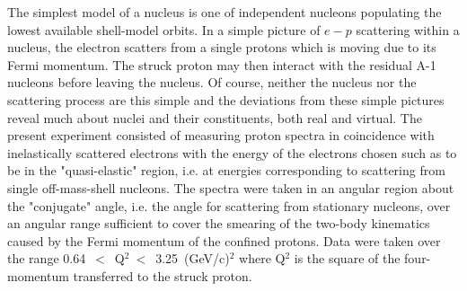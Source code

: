 \documentclass[aps,prl,twocolumn,showpacs,amsmath,amssymb,floats]{revtex4}
\begin{document}
The  simplest  model of  a  nucleus  is  one of  independent  nucleons
populating  the  lowest available  shell-model  orbits.  In a simple
picture of $e-p$ scattering within a  nucleus, the electron scatters from a
single protons which is moving due to its Fermi momentum. The struck proton 
may then interact with the residual A-1 nucleons before leaving the nucleus.  
Of course,  neither the nucleus nor the scattering process  are this simple 
and the deviations from  these  simple  pictures  reveal  much  about  
nuclei  and  their constituents, both real and virtual.  The present 
experiment consisted
of  measuring   proton  spectra  in   coincidence  with  inelastically
scattered electrons with the energy of the electrons chosen such as to
be in  the "quasi-elastic" region,  i.e. at energies  corresponding to
scattering  from  single off-mass-shell  nucleons.   The spectra  were
taken in an angular region about the "conjugate" angle, i.e. the angle
for  scattering  from  stationary  nucleons,  over  an  angular  range
sufficient to cover the smearing  of the two-body kinematics caused by
the Fermi momentum of the  confined protons.  Data were taken over the
range 0.64~$<$~Q$^2~<$~3.25~(GeV/c)$^2$  where Q$^2$ is  the square of the 
four-momentum transferred to the struck proton.
\end{document}
